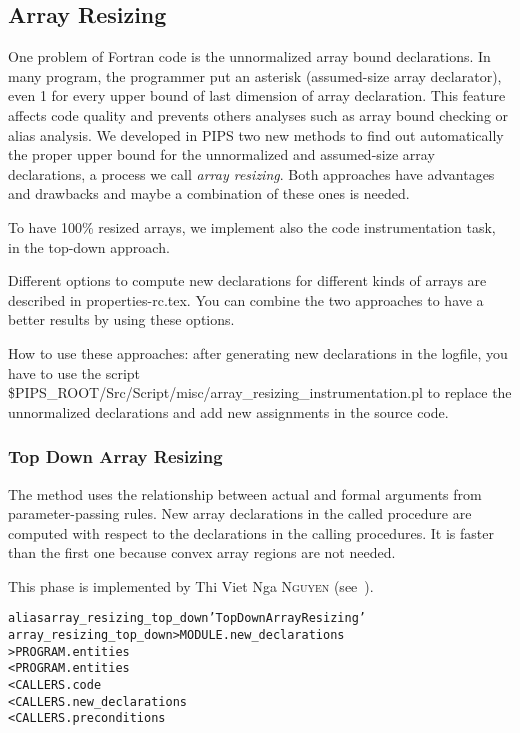 \documentclass[a4paper]{report}
\newenvironment{PipsMake}{\begin{alltt}}{\end{alltt}}
\newenvironment{PipsPass}[1]{\label{pass:#1}}{}
\begin{document}
\subsection{Array Resizing}
\label{subsubsection-array-resizing}

One problem of Fortran code is the unnormalized array bound
declarations. In many program, the programmer put an asterisk
(assumed-size array declarator), even 1 for every
upper bound of last dimension of array declaration. This feature affects
code quality and prevents others analyses such as array bound checking or
alias analysis. We developed in PIPS two new methods to find out
automatically the proper upper bound for the unnormalized and assumed-size
array declarations, a process we call {\em array resizing}. Both
approaches have advantages and drawbacks and maybe a combination of these
ones is needed.

To have 100\% resized arrays, we implement also the code instrumentation
task, in the top-down approach.

Different options to compute new declarations for different kinds of
arrays are described in properties-rc.tex. You can combine the two
approaches to have a better results by using these options.

How to use these approaches: after generating new declarations in the
logfile, you have to use the script
\$PIPS\_ROOT/Src/Script/misc/array\_resizing\_instrumentation.pl to replace the unnormalized
declarations and add new assignments in the source code.


\subsubsection{Top Down Array Resizing}
\begin{PipsPass}{array_resizing_top_down}

The  method uses the relationship between actual and formal arguments from parameter-passing
rules. New array declarations in the called procedure are
computed with respect to the declarations in the calling procedures.
It is  faster than the first one because convex array regions are not needed.

This phase is implemented by Thi Viet Nga \textsc{Nguyen} (see~\cite{Ngu02}).
\end{PipsPass}

\begin{PipsMake}
alias array_resizing_top_down 'Top Down Array Resizing'
array_resizing_top_down         > MODULE.new_declarations
                                > PROGRAM.entities
        < PROGRAM.entities
        < CALLERS.code
        < CALLERS.new_declarations
        < CALLERS.preconditions
\end{PipsMake}
\end{document}
